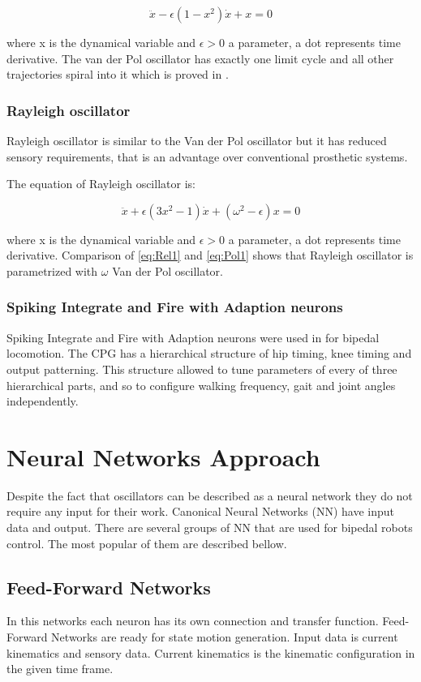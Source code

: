 \documentclass[12pt,a4paper]{report}
\begin{document}
				\begin{equation}\label{eq:Pol1}
					\ddot{x} - \epsilon(1 - x^2)\dot{x} + x = 0
				\end{equation}
				
				where x is the dynamical variable and $\epsilon > 0$ a parameter, a dot represents time derivative.
				The van der Pol oscillator has exactly one limit cycle and all other trajectories spiral into it which is proved in \cite{kanamaru2007van}.
			\subsubsection{Rayleigh oscillator}
				Rayleigh oscillator is similar to the Van der Pol oscillator but it has reduced sensory requirements, that is an advantage over conventional prosthetic systems.
				
				The equation of Rayleigh oscillator is:
				
				\begin{equation}\label{eq:Rel1}
					\ddot{x} + \epsilon(3x^2 - 1)\dot{x} + (\omega^2 - \epsilon)x = 0
				\end{equation}
				
				where x is the dynamical variable and $\epsilon > 0$ a parameter, a dot represents time derivative.
				Comparison of \ref{eq:Rel1} and \ref{eq:Pol1} shows that Rayleigh oscillator is parametrized with $\omega$ Van der Pol oscillator.
			\subsubsection{Spiking Integrate and Fire with Adaption neurons}
				Spiking Integrate and Fire with Adaption neurons were used in \cite{russell2007configuring} for bipedal locomotion. The CPG has a hierarchical structure of hip timing, knee timing and output patterning. This structure allowed to tune parameters of every of three hierarchical parts, and so to configure walking frequency, gait and joint angles independently.
		\section{Neural Networks Approach}
		Despite the fact that oscillators can be described as a neural network they do not require any input for their work. Canonical Neural Networks (NN) have input data and output. There are several groups of NN that are used for bipedal robots control. The most popular of them are described bellow.

			\subsection{Feed-Forward Networks}
				In this networks each neuron has its own connection and transfer function. Feed-Forward Networks are ready for state motion generation.  Input data is current kinematics and sensory data. Current kinematics is the kinematic configuration in the given time frame. 
\end{document}
